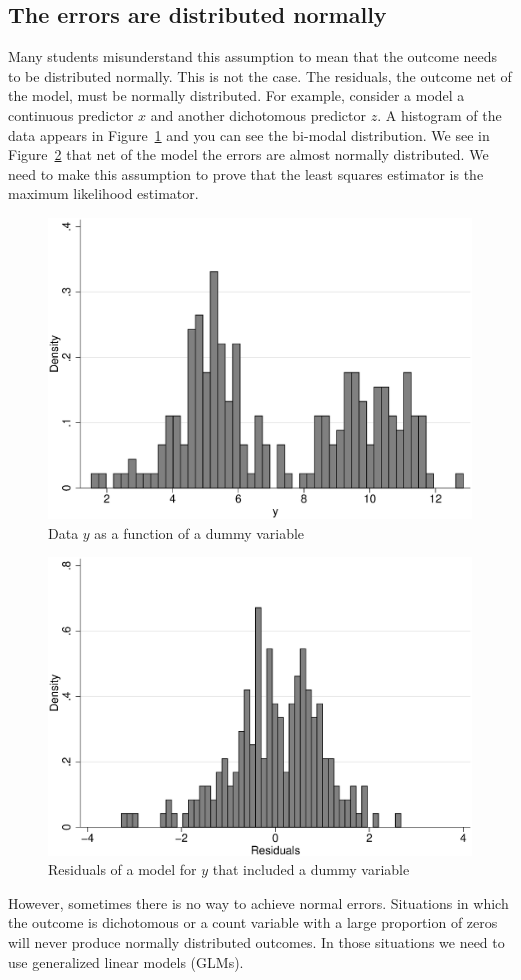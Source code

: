 \subsection{The errors are distributed normally}
Many students misunderstand this assumption to mean that the outcome needs to be distributed normally. This is not the case. The residuals, the outcome net of the model, must be normally distributed.
For example, consider a model a continuous predictor $x$ and another dichotomous predictor $z$. A histogram of the data appears in Figure~\ref{fig:dummyhist} and you can see the bi-modal distribution. We see in Figure~\ref{fig:dummyhist_r} that net of the model the errors are almost normally distributed. We need to make this assumption to prove that the least squares estimator is the maximum likelihood estimator.
\begin{figure}
   \centering
   \includegraphics[angle=0,
           width=.75\textwidth]{dummyhist.eps}
   \caption{Data $y$ as a function of a dummy variable}
  \label{fig:dummyhist}
\end{figure}
\begin{figure}
   \centering
   \includegraphics[angle=0,
           width=.75\textwidth]{dummyhist_r.eps}
   \caption{Residuals of a model for $y$ that included a dummy variable}
  \label{fig:dummyhist_r}
\end{figure}

However, sometimes there is no way to achieve normal errors. Situations in which the outcome is dichotomous or a count variable with a large proportion of zeros will never produce normally distributed outcomes. In those situations we need to use generalized linear models (GLMs). 